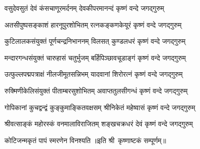 
\twolineshloka
{वसुदेवसुतं देवं कंसचाणूरमर्दनम्}
{देवकीपरमानन्दं कृष्णं वन्दे जगद्गुरुम्}

\twolineshloka
{अतसीपुष्पसङ्काशं हारनूपुरशोभितम्}
{रत्नकङ्कणकेयूरं कृष्णं वन्दे जगद्गुरुम्}

\twolineshloka
{कुटिलालकसंयुक्तं पूर्णचन्द्रनिभाननम्}
{विलसत् कुण्डलधरं कृष्णं वन्दे जगद्गुरुम्}

\twolineshloka
{मन्दारगन्धसंयुक्तं चारुहासं चतुर्भुजम्}
{बर्हिपिञ्छावचूडाङ्गं कृष्णं वन्दे जगद्गुरुम्}

\twolineshloka
{उत्फुल्लपद्मपत्राक्षं नीलजीमूतसन्निभम्}
{यादवानां शिरोरत्नं कृष्णं वन्दे जगद्गुरुम्}

\twolineshloka
{रुक्मिणीकेलिसंयुक्तं पीताम्बरसुशोभितम्}
{अवाप्ततुलसीगन्धं कृष्णं वन्दे जगद्गुरुम्}

\twolineshloka
{गोपिकानां कुचद्वन्द्वं कुङ्कुमाङ्कितवक्षसम्}
{श्रीनिकेतं महेष्वासं कृष्णं वन्दे जगद्गुरुम्}

\twolineshloka
{श्रीवत्साङ्कं महोरस्कं वनमालाविराजितम्}
{शङ्खचक्रधरं देवं कृष्णं वन्दे जगद्गुरुम्}

{कोटिजन्मकृतं पापं स्मरणेन विनश्यति}
॥इति श्री~कृष्णाष्टकं सम्पूर्णम्॥